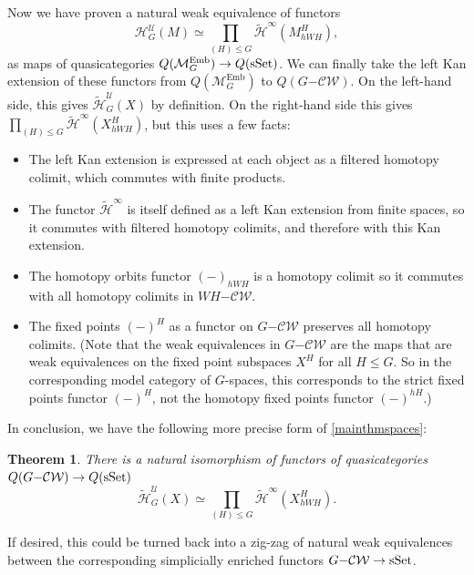 \documentclass[11pt]{amsart}
\newtheorem{thm}{Theorem}[section]
\theoremstyle{definition}
\numberwithin{equation}{section}
\numberwithin{figure}{section}
\newcommand{\mc}{\mathcal}
\newcommand{\sSet}{\textup{sSet}}
\newcommand{\Man}{\mc M^\mathrm{Emb}}
\newlength{\storeparskip}
\begin{document}
Now we have proven a natural weak equivalence of functors
\[ \mc H^{\mc U}_G(M) \simeq \prod_{(H) \leq G} \widetilde{\mc H}^\infty(M^{H}_{hWH}) , \]
as maps of quasicategories $Q(\Man_G) \to Q(\sSet)$. We can finally take the left Kan extension of these functors from $Q(\Man_G)$ to $Q(G\mc{-CW})$. On the left-hand side, this gives $\widetilde{\mc H}^{\mc U}_G(X)$ by definition. On the right-hand side this gives $\prod_{(H) \leq G} \widetilde{\mc H}^\infty(X^{H}_{hWH})$, but this uses a few facts:
\begin{itemize}
	\item The left Kan extension is expressed at each object as a filtered homotopy colimit, which commutes with finite products.
	\item The functor $\widetilde{\mc H}^\infty$ is itself defined as a left Kan extension from finite spaces, so it commutes with filtered homotopy colimits, and therefore with this Kan extension.
	\item The homotopy orbits functor $(-)_{hWH}$ is a homotopy colimit so it commutes with all homotopy colimits in $WH\mc{-CW}$.
	\item The fixed points $(-)^H$ as a functor on $G\mc{-CW}$ preserves all homotopy colimits. (Note that the weak equivalences in $G\mc{-CW}$ are the maps that are weak equivalences on the fixed point subspaces $X^H$ for all $H \leq G$. So in the corresponding model category of $G$-spaces, this corresponds to the strict fixed points functor $(-)^H$, not the homotopy fixed points functor $(-)^{hH}$.)
\end{itemize}
In conclusion, we have the following more precise form of \autoref{mainthmspaces}:
\begin{thm}\label{natural_stable_splitting_thm}
	There is a natural isomorphism of functors of quasicategories $Q(G\mc{-CW}) \to Q(\sSet)$
	$$\widetilde{\mc H}_G^\mathcal{U}(X)\simeq \prod_{(H) \leq G} \widetilde{\mc H}^\infty(X^H_{hWH} ).$$
\end{thm}
If desired, this could be turned back into a zig-zag of natural weak equivalences between the corresponding simplicially enriched functors $G\mc{-CW} \to \sSet$.






  
  



\begingroup%
\setlength{\parskip}{\storeparskip}%
\end{document}
